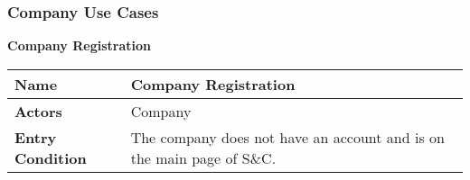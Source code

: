     \newpage
    \subsubsection{Company Use Cases}
    
        \begin{enumerate}[label=\textbf{[US\arabic*]}, left = 0pt, align = left, start=2]
            \item \textbf{Company Registration}
        
            \begin{longtable}{|l|p{11cm}|}  
                \hline
                \textbf{Name} & 
                    \textbf{Company Registration} \\
                \hline
                
                \textbf{Actors} & 
                    Company \\
                \hline
                
                \textbf{Entry Condition} & 
                    The company does not have an account and is on the main page of S\&C. \\
                \hline
                

\end{longtable}
\end{enumerate}
